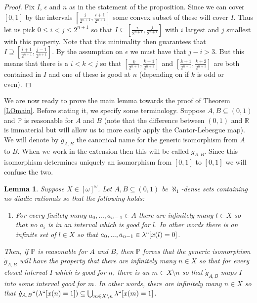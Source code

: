 \documentclass[leqno,11pt]{amsart}
\newtheorem{lemma}[theorem]{Lemma}
\theoremstyle{definition}
\theoremstyle{remark}
\def\P{\mathbb P}
\begin{document}

\begin{proof}
    Fix $I$, $\epsilon$ and $n$ as in the statement of the proposition. Since we can cover $[0, 1]$ by the intervals $[\frac{i}{2^{n+1}}, \frac{i+1}{2^{n+1}}]$ some convex subset of these will cover $I$. Thus let us pick $0\leq i < j \leq 2^{n+1}$ so that $I \subseteq [\frac{i}{2^{n+1}}, \frac{j}{2^{n+1}}]$ with $i$ largest and $j$ smallest with this property. Note that this minimality then guarantees that $I \supseteq [\frac{i+1}{2^{n+1}}, \frac{j-1}{2^{n+1}}]$. By the assumption on $\epsilon$ we must have that $j -i > 3$. But this means that there is a $i< k < j$ so that $[\frac{k}{2^{n+1}}, \frac{k + 1}{2^{n+1}}]$ and $[\frac{k+1}{2^{n+1}}, \frac{k + 2}{2^{n+1}}]$ are both contained in $I$ and one of these is good at $n$ (depending on if $k$ is odd or even). 
\end{proof}

We are now ready to prove the main lemma towards the proof of Theorem \ref{LOmain}. Before stating it, we specify some terminology. Suppose $A, B \subseteq (0, 1)$ and $\P$ is reasonable for $A$ and $B$ (note that the difference between $(0, 1)$ and $\mathbb R$ is immaterial but will allow us to more easily apply the Cantor-Lebesgue map). We will denote by $\dot{g}_{A, B}$ the canonical name for the generic isomorphism from $A$ to $B$. When we work in the extension then this will be called $g_{A, B}$. Since this isomorphism determines uniquely an isomorphism from $[0, 1]$ to $[0, 1]$ we will confuse the two. 

\begin{lemma} \label{mainlemma}
   Suppose $X \in [\omega]^\omega$. Let $A, B \subseteq (0, 1)$ be $\aleph_1$-dense sets containing no diadic rationals so that the following holds:
   \begin{enumerate}
       \item For every finitely many $a_0, ..., a_{n-1} \in A$ there are infinitely many $l \in X$ so that no $a_i$ is in an interval which is good for $l$. In other words there is an infinite set of $l \in X$ so that $a_0, ..., a_{n-1} \in \lambda``[x(l) = 0]$. \label{assumption on A}
   \end{enumerate}

   Then, if $\P$ is reasonable for $A$ and $B$, then $\P$ forces that the generic isomorphism $\dot{g}_{A, B}$ will have the property that there are infinitely many $n \in X$ so that for every closed interval $I$ which is good for $n$, there is an $m \in X \setminus n$ so that $\dot{g}_{A, B}$ maps $I$ into some interval good for $m$. In other words, there are infinitely many $n \in X$ so that $\dot{g}_{A, B} ``(\lambda``[x(n) = 1]) \subseteq \bigcup_{m \in X \setminus n} \lambda ``[x(m) = 1]$. \label{control}
\end{lemma}
\end{document}

